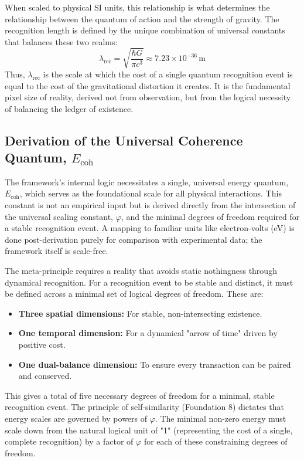 \documentclass[11pt,a4paper]{article}
\begin{document}
When scaled to physical SI units, this relationship is what determines the relationship between the quantum of action and the strength of gravity. The recognition length is defined by the unique combination of universal constants that balances these two realms:
\begin{equation}
\lambda_{\text{rec}} = \sqrt{\frac{\hbar G}{\pi c^3}} \approx 7.23 \times 10^{-36}\,\mathrm{m}
\end{equation}
Thus, \(\lambda_{\text{rec}}\) is the scale at which the cost of a single quantum recognition event is equal to the cost of the gravitational distortion it creates. It is the fundamental pixel size of reality, derived not from observation, but from the logical necessity of balancing the ledger of existence.

\subsection{Derivation of the Universal Coherence Quantum, \texorpdfstring{$E_{\text{coh}}$}{E_coh}}
The framework's internal logic necessitates a single, universal energy quantum, \(E_{\text{coh}}\), which serves as the foundational scale for all physical interactions. This constant is not an empirical input but is derived directly from the intersection of the universal scaling constant, \(\varphi\), and the minimal degrees of freedom required for a stable recognition event. A mapping to familiar units like electron-volts (eV) is done post-derivation purely for comparison with experimental data; the framework itself is scale-free.

The meta-principle requires a reality that avoids static nothingness through dynamical recognition. For a recognition event to be stable and distinct, it must be defined across a minimal set of logical degrees of freedom. These are:
\begin{itemize}
    \item \textbf{Three spatial dimensions:} For stable, non-intersecting existence.
    \item \textbf{One temporal dimension:} For a dynamical "arrow of time" driven by positive cost.
    \item \textbf{One dual-balance dimension:} To ensure every transaction can be paired and conserved.
\end{itemize}
This gives a total of five necessary degrees of freedom for a minimal, stable recognition event. The principle of self-similarity (Foundation 8) dictates that energy scales are governed by powers of \(\varphi\). The minimal non-zero energy must scale down from the natural logical unit of "1" (representing the cost of a single, complete recognition) by a factor of \(\varphi\) for each of these constraining degrees of freedom.
\end{document}
